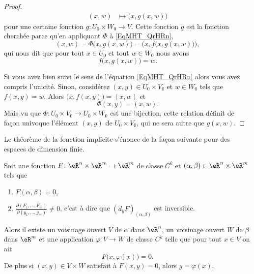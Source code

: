 \begin{proof}
\begin{equation}
\begin{aligned}
            (x,w)&\mapsto \big( x,g(x,w) \big)
        \end{aligned}
    \end{equation}
    pour une certaine fonction \( g\colon U_0\times W_0\to V\). Cette fonction \( g\) est la fonction cherchée parce qu'en appliquant \( \Phi\) à \eqref{EqMHT_QrHRn},
    \begin{equation}
        (x,w)=\Phi\big( x,g(x,w) \big)=\Big( x,f\big( x,g(x,w) \big) \Big),
    \end{equation}
    qui nous dit que pour tout \( x\in U_0\) et tout \( w\in W_0\) nous avons
    \begin{equation}
        f\big( x,g(x,w) \big)=w.
    \end{equation}

    Si vous avez bien suivi le sens de l'équation \eqref{EqMHT_QrHRn} alors vous avez compris l'unicité. Sinon, considérez \( (x,y)\in U_0\times V_0\) et \( w\in W_0\) tels que \( f(x,y)=w\). Alors \( \big( x,f(x,y) \big)=(x,w)\) et
    \begin{equation}
        \Phi(x,y)=(x,w).
    \end{equation}
    Mais vu que \( \Phi\colon U_0\times V_0\to U_0\times W_0\) est une bijection, cette relation définit de façon univoque l'élément \( (x,y)\) de \( U_0\times V_0\), qui ne sera autre que \( g(x,w)\).
\end{proof}

Le théorème de la fonction implicite s'énonce de la façon suivante pour des espaces de dimension finie.
\begin{theorem}   \label{ThoRYN_jvZrZ}
    Soit une fonction \( F\colon \eR^n\times \eR^m\to \eR^m\) de classe \( C^k\) et \( (\alpha,\beta)\in \eR^n\times \eR^m\) tels que
    \begin{enumerate}
        \item
            \( F(\alpha,\beta)=0\),
        \item
            \( \frac{ \partial (F_1,\ldots, F_m) }{ \partial (y_1,\ldots, y_m) }\neq 0\), c'est à dire que \( (d_yF)_{(\alpha,\beta)} \) est inversible.
    \end{enumerate}
    Alors il existe un voisinage ouvert \( V\) de \( \alpha\) dans \( \eR^n\), un voisinage ouvert \( W\) de \( \beta\) dans \( \eR^m\) et une application \( \varphi\colon V\to W\) de classe \( C^k\)  telle que pour tout \( x\in V\) on ait
    \begin{equation}
        F\big( x,\varphi(x) \big)=0.
    \end{equation}
    De plus si \( (x,y)\in V\times W\) satisfait à \( F(x,y)=0\), alors \( y=\varphi(x)\).
\end{theorem}

